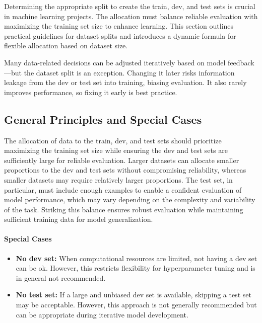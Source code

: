 \documentclass[12pt,openany, draft]{book}
\begin{document}
Determining the appropriate split to create the train, dev, and test sets is crucial in machine learning projects. The allocation must balance reliable evaluation with maximizing the training set size to enhance learning. This section outlines practical guidelines for dataset splits and introduces a dynamic formula for flexible allocation based on dataset size.

\begin{notebox}
Many data-related decisions can be adjusted iteratively based on model feedback—but the dataset split is an exception. Changing it later risks information leakage from the dev or test set into training, biasing evaluation. It also rarely improves performance, so fixing it early is best practice.
\end{notebox}


\subsection{General Principles and Special Cases}

The allocation of data to the train, dev, and test sets should prioritize maximizing the training set size while ensuring the dev and test sets are sufficiently large for reliable evaluation. Larger datasets can allocate smaller proportions to the dev and test sets without compromising reliability, whereas smaller datasets may require relatively larger proportions. The test set, in particular, must include enough examples to enable a confident evaluation of model performance, which may vary depending on the complexity and variability of the task. Striking this balance ensures robust evaluation while maintaining sufficient training data for model generalization.

\paragraph{Special Cases}
\begin{itemize}
    \item \textbf{No dev set:} When computational resources are limited, not having a dev set can be ok. However, this restricts flexibility for hyperparameter tuning and is in general not recommended.
    \item \textbf{No test set:} If a large and unbiased dev set is available, skipping a test set may be acceptable. However, this approach is not generally recommended but can be appropriate during iterative model development.
\end{itemize}
\end{document}
